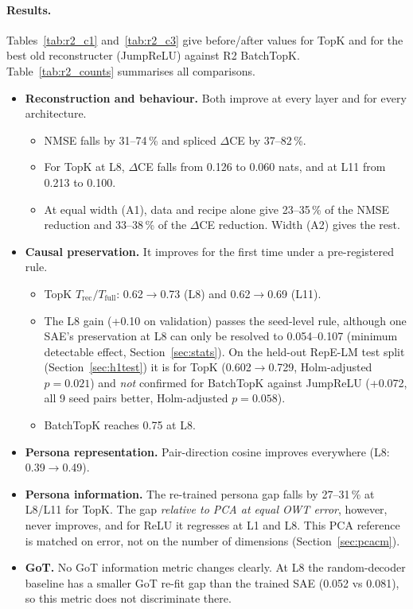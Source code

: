 \paragraph{Results.} Tables~\ref{tab:r2_c1} and~\ref{tab:r2_c3} give before/after values for TopK and for the best old
reconstructer (JumpReLU) against R2 BatchTopK. Table~\ref{tab:r2_counts} summarises all comparisons.
\begin{itemize}
\item \textbf{Reconstruction and behaviour.} Both improve at every layer and for every architecture.
  \begin{itemize}
  \item NMSE falls by 31--74\,\% and spliced $\Delta$CE by 37--82\,\%.
  \item For TopK at L8, $\Delta$CE falls from 0.126 to 0.060 nats, and at L11 from 0.213 to 0.100.
  \item At equal width (A1), data and recipe alone give 23--35\,\% of the NMSE reduction and 33--38\,\% of the
    $\Delta$CE reduction. Width (A2) gives the rest.
  \end{itemize}
\item \textbf{Causal preservation.} It improves for the first time under a pre-registered rule.
  \begin{itemize}
  \item TopK $T_{\text{rec}}/T_{\text{full}}$: 0.62$\to$0.73 (L8) and 0.62$\to$0.69 (L11).
  \item The L8 gain (+0.10 on validation) passes the seed-level rule, although one SAE's preservation at L8 can
    only be resolved to 0.054--0.107 (minimum detectable effect, Section~\ref{sec:stats}). On the held-out RepE-LM
    test split (Section~\ref{sec:h1test}) it is  for TopK (0.602$\to$0.729, Holm-adjusted
    $p=0.021$) and \emph{not} confirmed for BatchTopK against JumpReLU (+0.072, all 9 seed pairs better,
    Holm-adjusted $p=0.058$).
  \item BatchTopK reaches 0.75 at L8.
  \end{itemize}
\item \textbf{Persona representation.} Pair-direction cosine improves everywhere (L8: 0.39$\to$0.49).
\item \textbf{Persona information.} The re-trained persona gap falls by 27--31\,\% at L8/L11 for TopK. The gap
  \emph{relative to PCA at equal OWT error}, however, never improves, and for ReLU it regresses at L1 and L8. This
  PCA reference is matched on error, not on the number of dimensions (Section~\ref{sec:pcacm}).
\item \textbf{GoT.} No GoT information metric changes clearly. At L8 the random-decoder baseline has a smaller GoT
  re-fit gap than the trained SAE (0.052 vs 0.081), so this metric does not discriminate there.
\end{itemize}

